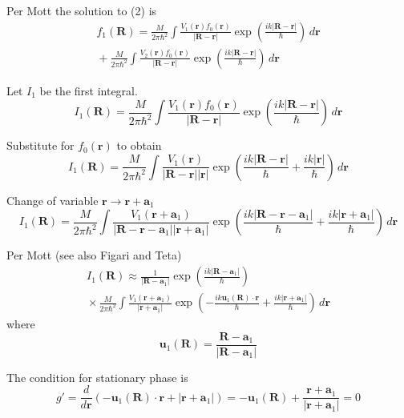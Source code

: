 \documentclass[12pt]{article}
\begin{document}
Per Mott the solution to (2) is
\begin{multline*}
f_1(\mathbf R)=
\frac{M}{2\pi\hbar^2}\int\frac{V_1(\mathbf r)f_0(\mathbf r)}{|\mathbf R-\mathbf r|}
\exp\left(\frac{ik|\mathbf R-\mathbf r|}{\hbar}\right)\,d\mathbf r
\\
{}+\frac{M}{2\pi\hbar^2}\int\frac{V_2(\mathbf r)f_0(\mathbf r)}{|\mathbf R-\mathbf r|}
\exp\left(\frac{ik|\mathbf R-\mathbf r|}{\hbar}\right)\,d\mathbf r
\end{multline*}

Let $I_1$ be the first integral.
\begin{equation*}
I_1(\mathbf R)=
\frac{M}{2\pi\hbar^2}\int\frac{V_1(\mathbf r)f_0(\mathbf r)}{|\mathbf R-\mathbf r|}
\exp\left(\frac{ik|\mathbf R-\mathbf r|}{\hbar}\right)\,d\mathbf r
\end{equation*}

Substitute for $f_0(\mathbf r)$ to obtain
\begin{equation*}
I_1(\mathbf R)=
\frac{M}{2\pi\hbar^2}\int\frac{V_1(\mathbf r)}{|\mathbf R-\mathbf r||\mathbf r|}
\exp\left(\frac{ik|\mathbf R-\mathbf r|}{\hbar}+\frac{ik|\mathbf r|}{\hbar}\right)\,d\mathbf r
\end{equation*}

Change of variable $\mathbf r\rightarrow\mathbf r+\mathbf a_1$
\begin{equation*}
I_1(\mathbf R)=
\frac{M}{2\pi\hbar^2}
\int
\frac{V_1(\mathbf r+\mathbf a_1)}{|\mathbf R-\mathbf r-\mathbf a_1||\mathbf r+\mathbf a_1|}
\exp\left(
\frac{ik|\mathbf R-\mathbf r-\mathbf a_1|}{\hbar}+\frac{ik|\mathbf r+\mathbf a_1|}{\hbar}
\right)\,d\mathbf r
\end{equation*}

Per Mott (see also Figari and Teta)
\begin{multline*}
I_1(\mathbf R)\approx\frac{1}{|\mathbf R-\mathbf a_1|}
\exp\left(\frac{ik|\mathbf R-\mathbf a_1|}{\hbar}\right)
\\
{}\times
\frac{M}{2\pi\hbar^2}
\int
\frac{V_1(\mathbf r+\mathbf a_1)}{|\mathbf r+\mathbf a_1|}
\exp\left(-\frac{ik\mathbf u_1(\mathbf R)\cdot\mathbf r}{\hbar}
+\frac{ik|\mathbf r+\mathbf a_1|}{\hbar}\right)
\,d\mathbf r
\end{multline*}
where
\begin{equation*}
\mathbf u_1(\mathbf R)=\frac{\mathbf R-\mathbf a_1}{|\mathbf R-\mathbf a_1|}
\end{equation*}

The condition for stationary phase is
\begin{equation*}
g'=\frac{d}{d\mathbf r}\left(-\mathbf u_1(\mathbf R)\cdot\mathbf r+|\mathbf r+\mathbf a_1|\right)
=-\mathbf u_1(\mathbf R)+\frac{\mathbf r+\mathbf a_1}{|\mathbf r+\mathbf a_1|}=0
\end{equation*}
\end{document}
